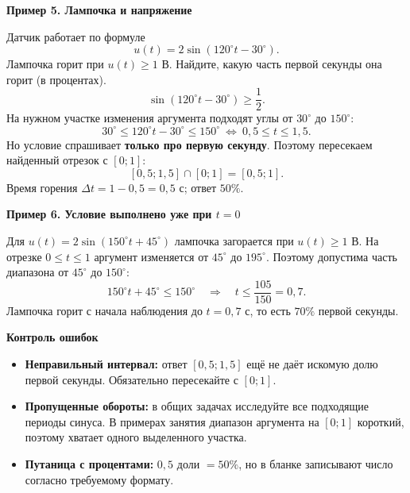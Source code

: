 \documentclass[a4paper,12pt]{article}
\newcommand{\sectiontitle}[1]{\vspace{4pt}{\Large\bfseries\color{darkaccent} #1}\par\vspace{1pt}{\color{accent}\rule{\linewidth}{0.55pt}}\vspace{3pt}}
\newcommand{\subsectiontitle}[1]{{\large\bfseries\color{darkaccent}#1}\par}
\newcommand{\key}[1]{{\color{darkaccent}\bfseries #1}}
\newcommand{\degc}{^{\circ}}
\begin{document}
\sectiontitle{05. Если у синуса есть фазовый сдвиг}
\subsectiontitle{Пример 5. Лампочка и напряжение}
Датчик работает по формуле
\[
 u(t)=2\sin(120\degc t-30\degc).
\]
Лампочка горит при $u(t)\ge1$ В. Найдите, какую часть первой секунды она горит (в процентах). 
\[
 \sin(120\degc t-30\degc)\ge\frac12.
\]
На нужном участке изменения аргумента подходят углы от $30\degc$ до $150\degc$:
\[
 30\degc\le120\degc t-30\degc\le150\degc
 \ \Longleftrightarrow\ \boxed{0{,}5\le t\le1{,}5}.
\]
Но условие спрашивает \key{только про первую секунду}. Поэтому пересекаем найденный отрезок с $[0;1]$:
\[
 [0{,}5;1{,}5]\cap[0;1]=[0{,}5;1].
\]
Время горения $\Delta t=1-0{,}5=0{,}5$ с; ответ $\boxed{50\%}$.

\begin{center}
\end{center}

\subsectiontitle{Пример 6. Условие выполнено уже при $t=0$}
Для $u(t)=2\sin(150\degc t+45\degc)$ лампочка загорается при $u(t)\ge1$ В. На отрезке $0\le t\le1$ аргумент изменяется от $45\degc$ до $195\degc$. Поэтому допустима часть диапазона от $45\degc$ до $150\degc$:
\[
 150\degc t+45\degc\le150\degc
 \quad\Longrightarrow\quad t\le\frac{105}{150}=0{,}7.
\]
Лампочка горит с начала наблюдения до $t=0{,}7$ с, то есть $\boxed{70\%}$ первой секунды.

\subsectiontitle{Контроль ошибок}
\begin{itemize}
\item \key{Неправильный интервал:} ответ $[0{,}5;1{,}5]$ ещё не даёт искомую долю первой секунды. Обязательно пересекайте с $[0;1]$.
\item \key{Пропущенные обороты:} в общих задачах исследуйте все подходящие периоды синуса. В примерах занятия диапазон аргумента на $[0;1]$ короткий, поэтому хватает одного выделенного участка.
\item \key{Путаница с процентами:} $0{,}5$ доли $=50\%$, но в бланке записывают число согласно требуемому формату.
\end{itemize}
\end{document}
